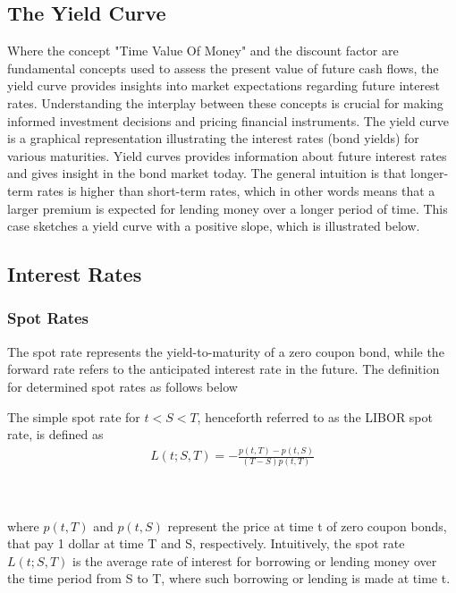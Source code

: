 \subsection{The Yield Curve}
Where the concept "Time Value Of Money" and the discount factor are fundamental concepts used to assess the present value of future
cash flows, the yield curve provides insights into market expectations regarding future interest rates.
Understanding the interplay between these concepts is crucial for making informed investment decisions and pricing
financial instruments. The yield curve is a graphical representation illustrating the interest rates (bond yields) for various maturities.
Yield curves provides information about future interest rates and gives insight in the bond market today. 
The general intuition is that longer-term rates is higher than short-term rates, which in other words means that a
larger premium is expected for lending money over a longer period of time. This case sketches a yield curve with a 
positive slope, which is illustrated below.
\begin{center}
\end{center}
\subsection{Interest Rates}
\subsubsection{Spot Rates}
The spot rate represents the yield-to-maturity of a zero coupon bond,
while the forward rate refers to the anticipated interest rate in the 
future. The definition for determined spot rates as follows 
below
\begin{definition}\label{def:spot}
    The simple spot rate for $t<S<T$, henceforth referred to as the 
    LIBOR spot rate, is defined as \cite{Bjork} 
    \begin{align*}
        L(t;S,T) = - \frac{p(t,T)-p(t,S)}{(T-S)p(t,T)}
    \end{align*}
\end{definition} 
\noindent
\\\\
where $p(t,T)$ and $p(t,S)$ represent the price at time t of zero coupon bonds, that pay
1 dollar at time T and S, respectively. Intuitively, the spot rate $L(t;S,T)$ is the 
average rate of interest for borrowing or lending money over the time period from S to T, 
where such borrowing or lending is made at time t. 
